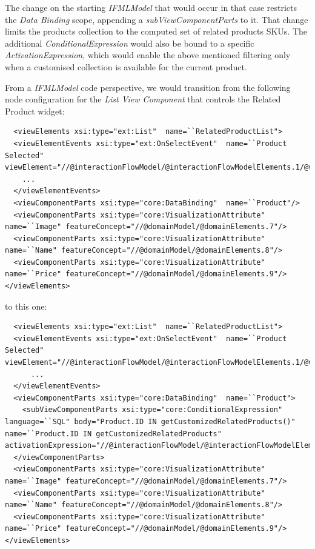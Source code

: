 The change on the starting \textit{IFMLModel} that would occur in that case restricts the \textit{Data Binding} scope, appending a \textit{subViewComponentParts} to it. That change limits the products collection to the computed set of related products SKUs. The additional \textit{ConditionalExpression} would also be bound to a specific \textit{ActivationExpression}, which would enable the above mentioned filtering only when a customised collection is available for the current product. 

From a \textit{IFMLModel} code perspective, we would transition from the following node configuration for the \textit{List View Component} that controls the Related Product widget:

\vspace{0.5cm}
\lstset{language=XML}
\begin{lstlisting} 
  <viewElements xsi:type="ext:List"  name=``RelatedProductList">
  <viewElementEvents xsi:type="ext:OnSelectEvent"  name=``Product Selected" viewElement="//@interactionFlowModel/@interactionFlowModelElements.1/@viewElements.2">
    ...
  </viewElementEvents>
  <viewComponentParts xsi:type="core:DataBinding"  name=``Product"/>
  <viewComponentParts xsi:type="core:VisualizationAttribute"  name=``Image" featureConcept="//@domainModel/@domainElements.7"/>
  <viewComponentParts xsi:type="core:VisualizationAttribute"  name=``Name" featureConcept="//@domainModel/@domainElements.8"/>
  <viewComponentParts xsi:type="core:VisualizationAttribute"  name=``Price" featureConcept="//@domainModel/@domainElements.9"/>
</viewElements>
\end{lstlisting}
\vspace{0.5cm}

to this one:

\vspace{0.5cm}
\lstset{language=XML}
\begin{lstlisting} 
  <viewElements xsi:type="ext:List"  name=``RelatedProductList">
  <viewElementEvents xsi:type="ext:OnSelectEvent"  name=``Product Selected" viewElement="//@interactionFlowModel/@interactionFlowModelElements.1/@viewElements.2">
      ...
  </viewElementEvents>
  <viewComponentParts xsi:type="core:DataBinding"  name=``Product">
    <subViewComponentParts xsi:type="core:ConditionalExpression"  language=``SQL" body="Product.ID IN getCustomizedRelatedProducts()" name=``Product.ID IN getCustomizedRelatedProducts" activationExpression="//@interactionFlowModel/@interactionFlowModelElements.17"/>
  </viewComponentParts>
  <viewComponentParts xsi:type="core:VisualizationAttribute"  name=``Image" featureConcept="//@domainModel/@domainElements.7"/>
  <viewComponentParts xsi:type="core:VisualizationAttribute"  name=``Name" featureConcept="//@domainModel/@domainElements.8"/>
  <viewComponentParts xsi:type="core:VisualizationAttribute"  name=``Price" featureConcept="//@domainModel/@domainElements.9"/>
</viewElements>
\end{lstlisting}
\vspace{0.5cm}

